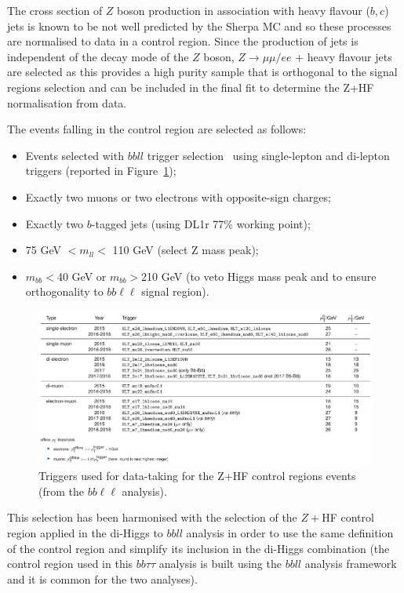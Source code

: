 The cross section of $Z$ boson production in association with heavy flavour ($b,c$) jets is known to be not well predicted by the Sherpa MC and so these processes are normalised to data in a control region. Since the production of jets is independent of the decay mode of the $Z$ boson, $Z \rightarrow \mu\mu/ee$ + heavy flavour jets are selected as this provides a high purity sample that is orthogonal to the signal regions selection and can be included in the final fit to determine the Z+HF normalisation from data.

The events falling in the control region are selected as follows:

\begin{itemize}
\item Events selected with $bbll$ trigger selection~\cite{Olsson:2765838} using single-lepton and di-lepton triggers (reported in Figure~\ref{fig:bbllTriggers});
\item Exactly two muons or two electrons with opposite-sign charges;
\item Exactly two $b$-tagged jets (using DL1r 77\% working point);
\item 75 GeV $<m_{ll}<$ 110 GeV (select Z mass peak);
\item $m_{bb}<$40 GeV or $m_{bb}>$210 GeV (to veto Higgs mass peak and to ensure orthogonality to $bb\ell\ell$ signal region).
\end{itemize}

\begin{figure}
\centering
\includegraphics[width=.9\textwidth]{figures/selection/bbllTriggers}
\caption{Triggers used for data-taking for the Z+HF control regions events (from the $bb\ell\ell$ analysis).}
\label{fig:bbllTriggers}
\end{figure}

This selection has been harmonised with the selection of the $Z+$HF control region applied in the di-Higgs to $bbll$ analysis in order to use the same definition of the control region and simplify its inclusion in the di-Higgs combination (the control region used in this $bb\tau\tau$ analysis is built using the $bbll$ analysis framework and it is common for the two analyses). 

